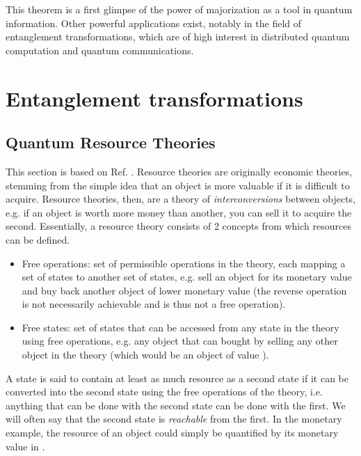 This theorem is a first glimpse of the power of majorization as a tool in quantum information. Other powerful applications exist, notably in the field of entanglement transformations, which are of high interest in distributed quantum computation and quantum communications.



\section{Entanglement transformations}

\subsection{Quantum Resource Theories} \label{sec:QRT}

This section is based on Ref. \cite[pp. 2--13, 39--40]{chitambar_quantum_2019}. Resource theories are originally economic theories, stemming from the simple idea that an object is more valuable if it is difficult to acquire. Resource theories, then, are a theory of \textit{interconversions} between objects, e.g. if an object is worth more money than another, you can sell it to acquire the second. Essentially, a resource theory consists of 2 concepts from which resources can be defined.

\begin{itemize}
    \item Free operations: set of permissible operations in the theory, each mapping a set of states to another set of states, e.g. sell an object for its monetary value and buy back another object of lower monetary value (the reverse operation is not necessarily achievable and is thus not a free operation).
    \item Free states: set of states that can be accessed from any state in the theory using free operations, e.g. any object that can bought by selling any other object in the theory (which would be an object of value ).
\end{itemize}

A state is said to contain at least as much resource as a second state if it can be converted into the second state using the free operations of the theory, i.e. anything that can be done with the second state can be done with the first. We will often say that the second state is \textit{reachable} from the first. In the monetary example, the resource of an object could simply be quantified by its monetary value in \texteuro.

